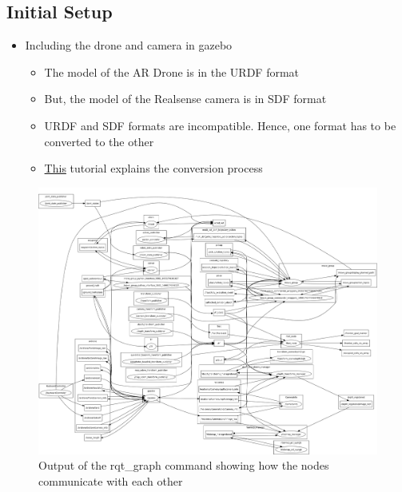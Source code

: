 \documentclass[a4paper,12pt,oneside]{book}
\begin{document}
\subsection*{Initial Setup}
\begin{itemize}
	\item Including the drone and camera in gazebo
		\begin{itemize}
			\item The model of the AR Drone is in the URDF format
			\item But, the model of the Realsense camera is in SDF format
			\item URDF and SDF formats are incompatible. Hence, one format has to be converted to the other
			\item \href{https://github.com/eYSIP-2017/eYSIP-2017_Indoor-Environments-Mapping-using-UAV/blob/master/Documents/Tutorials/Adding%20Realsense%20R200%20camera%20to%20ARDrone%20in%20Gazebo7.pptx}{This} tutorial explains the conversion process
		\end{itemize}
\end{itemize}

\begin{figure}[h]
	\centering
	\includegraphics[scale=0.13]{rosgraph}
	\caption{Output of the rqt\_graph command showing how the nodes communicate with each other}
\end{figure}
	
\end{document}
